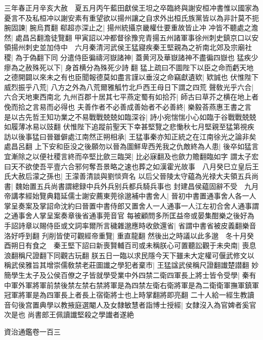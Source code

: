 三年春正月辛亥大赦　夏五月丙午藍田獻侯王坦之卒臨終與謝安桓冲書惟以國家為憂言不及私桓冲以謝安素有重望欲以揚州讓之自求外出桓氏族黨皆以為非計莫不扼腕固諫|{
	腕烏貫翻}
郗超亦深止之|{
	揚州統攝京畿權仕要重故皆止冲}
冲皆不聽處之澹然|{
	處昌呂翻澹徒覽翻}
甲寅詔以冲都督徐豫兖青揚五州諸軍事徐州刺史鎮京口以安領揚州刺史並加侍中　六月秦清河武侯王猛寢疾秦王堅親為之祈南北郊及宗廟社稷|{
	為于偽翻下同}
分遣侍臣徧禱河嶽諸神|{
	蓋黄河及華嶽諸神不盡徧四嶽也}
猛疾少瘳為之赦殊死以下|{
	身首横分為殊死少詩翻}
猛上疏曰不圖陛下以臣之命而虧天地之德開闢以來未之有也臣聞報德莫如盡言謹以垂沒之命竊獻遺欵|{
	欵誠也}
伏惟陛下威烈振乎八荒|{
	八方之外為八荒爾雅觚竹北戶西王母日下謂之四荒}
聲敎光乎六合|{
	六合天地東西南北}
九州百郡十居其七平燕定蜀有如拾芥|{
	師古曰草芥之横在地上者俛而拾之言易而必得也}
夫善作者不必善成善始者不必善終|{
	樂毅荅燕惠王書之言}
是以古先哲王知功業之不易戰戰兢兢如臨深谷|{
	詩小宛惴惴小心如臨于谷戰戰兢兢如履薄冰易以豉翻}
伏惟陛下追蹤前聖天下幸甚堅覽之悲慟秋七月堅親至猛第視疾訪以後事猛曰晉雖僻處江南然正朔相承|{
	王猛事秦亦知正統之在江南徐光之論非矣處昌呂翻}
上下安和臣没之後願勿以晉為圖鮮卑西羌我之仇敵終為人患|{
	後卒如猛言}
宜漸除之以便社稷言終而卒堅比歛三臨哭|{
	比必寐翻及也歛力贍翻臨如字}
謂太子宏曰天不欲使吾平壹六合邪何奪吾景略之速也葬之如漢霍光故事　八月癸巳立皇后王氏大赦后濛之孫也|{
	王濛善清談與劉惔齊名}
以后父晉陵太守藴為光禄大夫領五兵尚書|{
	魏始置五兵尚書謂總録中兵外兵别兵都兵騎兵事也}
封建昌侯藴固辭不受　九月帝講孝經始覽典籍延儒士謝安薦東莞徐邈補中書舍人|{
	晉初中書置通事舍人各一人掌呈奏案及掌詔命沈約曰晉置中書侍郎又置舍人一人通事一人江左初合舍人通事謂之通事舍人掌呈案奏章後省通事莞音官}
每被顧問多所匡益帝或晏集酣樂之後好為手詔詩章以賜侍臣或文詞率爾所言穢雜邈應時收歛還省|{
	省謂中書省被皮義翻樂音洛好呼到翻}
刋削皆使可觀經帝重覽|{
	重直龍翻}
然後出之時議以此多邈　冬十月癸酉朔日有食之　秦王堅下詔曰新喪賢輔百司或未稱朕心可置聽訟觀于未央南|{
	喪息浪翻稱尺證翻下同觀古玩翻}
朕五日一臨以求民隱今天下雖未大定權可偃武修文以稱武侯雅旨其增崇儒敎禁老莊圖䜟之學犯者棄市|{
	王猛諡武侯稱尺證翻䜟楚譛翻}
妙簡學生太子及公侯百僚之子皆就學受業中外四禁二衛四軍長上將士皆令受學|{
	秦有中軍外軍將軍前禁後禁左禁右禁將軍是為四禁左衛右衛將軍是為二衛衛軍撫軍鎮軍冠軍將軍是為四軍長上者長上宿衛將士也上時掌翻將即亮翻}
二十人給一經生教讀音句後宫置典學以教掖庭選閹人及女隸敏慧者詣博士授經|{
	女隸沒入為官婢者奚官次是也}
尚書郎王佩讀䜟堅殺之學䜟者遂絶

資治通鑑卷一百三
